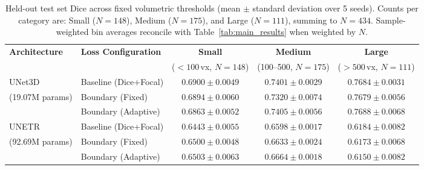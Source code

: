 \documentclass[10pt, a4paper, twocolumn]{article}
\begin{document}
\begin{table}[t]
\centering
\small
\setlength{\tabcolsep}{5pt}
\caption{Held-out test set Dice across fixed volumetric thresholds (mean $\pm$ standard deviation over 5 seeds). Counts per category are: Small ($N=148$), Medium ($N=175$), and Large ($N=111$), summing to $N=434$. Sample-weighted bin averages reconcile with Table~\ref{tab:main_results} when weighted by $N$.}
\label{tab:terciles}
\vspace{4pt}
\begin{tabular}{llccc}
\toprule
\textbf{Architecture} & \textbf{Loss Configuration} & \textbf{Small} & \textbf{Medium} & \textbf{Large} \\
 & & ($<100$\,vx, $N=148$) & (100--500, $N=175$) & ($>500$\,vx, $N=111$) \\
\midrule
UNet3D     & Baseline (Dice+Focal) & $0.6900 \pm 0.0049$ & $0.7401 \pm 0.0029$ & $0.7684 \pm 0.0031$ \\
(19.07M params) & Boundary (Fixed)      & $0.6894 \pm 0.0060$ & $0.7320 \pm 0.0074$ & $0.7679 \pm 0.0056$ \\
                & Boundary (Adaptive)   & $0.6863 \pm 0.0052$ & $0.7405 \pm 0.0056$ & $0.7688 \pm 0.0068$ \\
\midrule
UNETR           & Baseline (Dice+Focal) & $0.6443 \pm 0.0055$ & $0.6598 \pm 0.0017$ & $0.6184 \pm 0.0082$ \\
(92.69M params) & Boundary (Fixed)      & $0.6500 \pm 0.0048$ & $0.6633 \pm 0.0024$ & $0.6173 \pm 0.0068$ \\
                & Boundary (Adaptive)   & $0.6503 \pm 0.0063$ & $0.6664 \pm 0.0018$ & $0.6150 \pm 0.0082$ \\
\bottomrule
\end{tabular}
\end{table}
\end{document}
